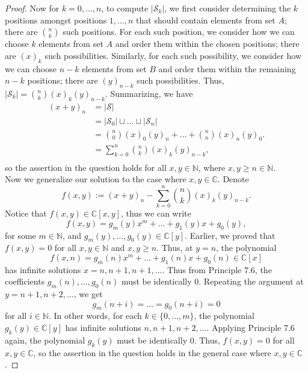 \documentclass{article}
\begin{document}
\begin{enumerate}[label={\bf Q\arabic*:}]
\begin{proof}
      Now for $k=0,\ldots,n$, to compute $|\mathcal{S}_k|$, we first
      consider determining the $k$ positions amongst positions $1,\ldots,n$
      that should contain elements from set $A$; there are $\binom{n}{k}$
      such positions. For each such position, we consider how we can choose
      $k$ elements from set $A$ and order them within the chosen positions;
      there are $(x)_k$ such possibilities. Similarly, for each such
      possibility, we consider how we can choose $n-k$ elements from set
      $B$ and order them within the remaining $n-k$ positions; there are
      $(y)_{n-k}$ such possibilities. Thus,
      $|\mathcal{S}_k|=\binom{n}{k}(x)_k(y)_{n-k}$. Summarizing, we have
      \begin{align*}
        (x+y)_n &=|\mathcal{S}| \\
        &=|\mathcal{S}_0|\sqcup\ldots\sqcup|\mathcal{S}_n| \\
        &=\binom{n}{0}(x)_0(y)_n +\ldots +\binom{n}{n}(x)_n(y)_0. \\
        &=\sum_{k=0}^n\binom{n}{k}(x)_k(y)_{n-k}, \\
      \end{align*}
      so the assertion in the question holds for all $x,y\in\mathbb{N}$,
      where $x,y\geq n\in\mathbb{N}$. \\

      Now we generalize our solution to the case where $x,y\in\mathbb{C}$.
      Denote \[f(x,y):=(x+y)_n-\sum_{k=0}^n\binom{n}{k}(x)_k(y)_{n-k}.\]
      Notice that $f(x,y)\in\mathbb{C}[x,y]$, thus we can write
      \[f(x,y)= g_m(y)x^m+\ldots+g_1(y)x+g_0(y),\]
      for some $m\in\mathbb{N}$, and
      $g_m(y),\ldots,g_0(y)\in\mathbb{C}[y]$. Earlier, we proved that
      $f(x,y)=0$ for all $x,y\in\mathbb{N}$ and $x,y\geq n$. Thus, at
      $y=n$, the polynomial
      \[f(x,n)= g_m(n)x^m+\ldots+g_1(n)x+g_0(n) \in\mathbb{C}[x]\]
      has infinite solutions $x=n,n+1,n+1,\ldots$. Thus from Principle 7.6,
      the coefficients $g_m(n),\ldots,g_0(n)$ must be identically 0.
      Repeating the argument at $y=n+1,n+2,\ldots$, we get
      \[g_m(n+i)=\ldots=g_0(n+i)=0\]
      for all $i\in\mathbb{N}$. In other words, for each
      $k\in\{0,\ldots,m\}$, the polynomial $g_k(y)\in\mathbb{C}[y]$ has
      infinite solutions $n,n+1,n+2,\ldots$. Applying Principle 7.6 again,
      the polynomial $g_k(y)$ must be identically 0. Thus, $f(x,y)=0$ for
      all $x,y\in\mathbb{C}$, so the assertion in the question holds in
      the general case where $x,y\in\mathbb{C}$.
    \end{proof}
\end{enumerate}
\end{document}
